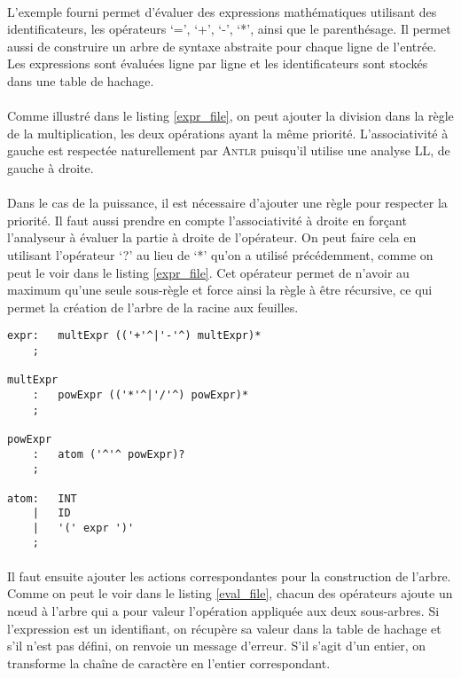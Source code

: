 \documentclass[paper=a4, fontsize=11pt]{scrartcl} %
\numberwithin{equation}{section} %
\numberwithin{figure}{section} %
\numberwithin{table}{section} %
\begin{document}
\paragraph{}L'exemple fourni permet d'évaluer des expressions mathématiques utilisant des 
identificateurs, les opérateurs `=', `+', `-', `*', ainsi que le parenthésage. 
Il permet aussi de construire un arbre de syntaxe abstraite pour chaque ligne 
de l'entrée. Les expressions sont évaluées ligne par ligne et les identificateurs sont stockés dans une table de hachage.


\paragraph{}Comme illustré dans le listing \ref{expr_file}, on peut ajouter la division dans la règle de la multiplication, les deux opérations ayant la même priorité. L'associativité à gauche est respectée naturellement par \textsc{Antlr} puisqu'il utilise une analyse LL, de gauche à droite.

\paragraph{}Dans le cas de la puissance, il est nécessaire d'ajouter une règle pour
respecter la priorité. Il faut aussi prendre en compte l'associativité à droite
en forçant l'analyseur à évaluer la partie à droite de l'opérateur. On peut
faire cela en utilisant l'opérateur `?' au lieu de `*' qu'on a utilisé
précédemment, comme on peut le voir dans le listing \ref{expr_file}. Cet
opérateur permet de n'avoir au maximum qu'une seule sous-règle et force ainsi la règle à être récursive, ce qui permet la création de l'arbre de la racine aux feuilles.

\newpage
    
\begin{lstlisting}[label=expr_file,caption=Fichier Expr.g,
linebackgroundcolor={\lstcolorlines[orange!30]{8,9,10}\lstcolorlines[blue!30]{5}}]
expr:   multExpr (('+'^|'-'^) multExpr)*
    ;

multExpr
    :   powExpr (('*'^|'/'^) powExpr)*
    ;

powExpr
    :   atom ('^'^ powExpr)?
    ;

atom:   INT
    |   ID
    |   '(' expr ')'
    ;
\end{lstlisting}

\paragraph{}Il faut ensuite ajouter les actions correspondantes pour la construction de l'arbre. Comme on peut le voir dans le listing \ref{eval_file}, chacun des opérateurs ajoute un nœud à l'arbre qui a pour valeur l'opération appliquée aux deux sous-arbres. Si l'expression est un identifiant, on récupère sa valeur dans la table de hachage et s'il n'est pas défini, on renvoie un message d'erreur. S'il s'agit d'un entier, on transforme la chaîne de caractère en l'entier correspondant. 
\end{document}
